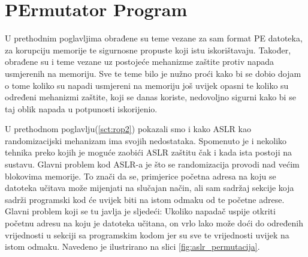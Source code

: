 \documentclass[times, utf8, diplomski, numeric]{fer}
\begin{document}
\chapter{PErmutator Program}
U prethodnim poglavljima obrađene su teme vezane za sam format PE datoteka, za korupciju memorije te sigurnosne propuste koji istu iskorištavaju. Također, obrađene su i teme vezane uz postojeće mehanizme zaštite protiv napada usmjerenih na memoriju. Sve te teme bilo je nužno proći kako bi se dobio dojam o tome koliko su napadi usmjereni na memoriju još uvijek opasni te koliko su određeni mehanizmi zaštite, koji se danas koriste, nedovoljno sigurni kako bi se taj oblik napada u potpunosti iskorijenio.

U prethodnom poglavlju(\ref{sct:rop2}) pokazali smo i kako ASLR kao randomizacijski mehanizam ima svojih nedostataka. Spomenuto je i nekoliko tehnika preko kojih je moguće zaobići ASLR zaštitu čak i kada ista postoji na sustavu. Glavni problem kod ASLR-a je što se randomizacija provodi nad većim blokovima memorije. To znači da se, primjerice početna adresa na koju se datoteka učitava može mijenjati na slučajan način, ali sam sadržaj sekcije koja sadrži programski kod će uvijek biti na istom odmaku od te početne adrese. Glavni problem koji se tu javlja je sljedeći: Ukoliko napadač uspije otkriti početnu adresu na koju je datoteka učitana, on vrlo lako može doći do određenih vrijednosti u sekciji sa programskim kodom jer su sve te vrijednosti uvijek na istom odmaku. Navedeno je ilustrirano na slici \ref{fig:aslr_permutacija}.
\end{document}
